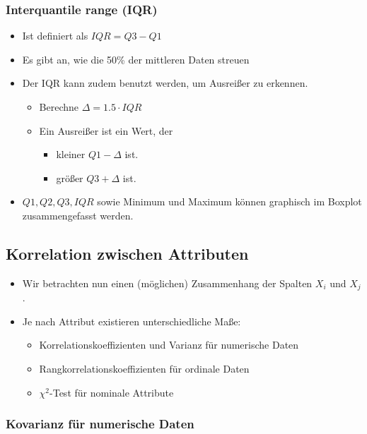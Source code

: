 \documentclass{scrartcl}
\begin{document}
\subsubsection{Interquantile range (IQR)}

\begin{itemize}
	\item Ist definiert als $ IQR = Q3 - Q1 $
	\item Es gibt an, wie die 50\% der mittleren Daten streuen
	\item Der IQR kann zudem benutzt werden, um Ausreißer zu erkennen.
	\begin{itemize}
		\item Berechne $ \Delta = 1.5 \cdot IQR $
		\item Ein Ausreißer ist ein Wert, der
		\begin{itemize}
			\item kleiner $ Q1 - \Delta $ ist.
			\item größer $ Q3 + \Delta $ ist.
		\end{itemize}
	\end{itemize}
	\item $ Q1,Q2,Q3,IQR $ sowie Minimum und Maximum können graphisch im 
	Boxplot zusammengefasst werden.
\end{itemize}

\subsection{Korrelation zwischen Attributen}

\begin{itemize}
	\item Wir betrachten nun einen (möglichen) Zusammenhang der Spalten $ X_i $ 
	und $ X_j $.
	\item Je nach Attribut existieren unterschiedliche Maße:
	\begin{itemize}
		\item Korrelationskoeffizienten und Varianz für numerische Daten
		\item Rangkorrelationskoeffizienten für ordinale Daten
		\item $ \chi^2 $-Test für nominale Attribute
	\end{itemize}
\end{itemize}

\subsubsection{Kovarianz für numerische Daten}
\end{document}
